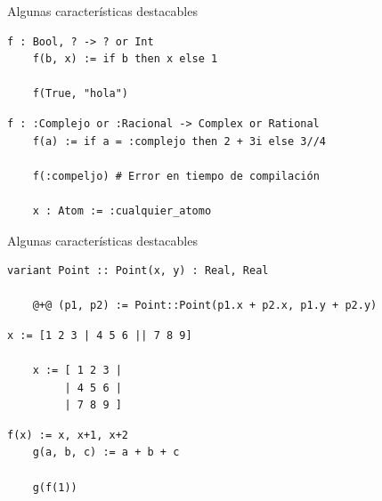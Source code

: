 \documentclass[compress]{beamer}
\begin{document}
\begin{frame}[fragile]{Algunas características destacables}
	\begin{lstlisting}[style=tail]
	f : Bool, ? -> ? or Int
	f(b, x) := if b then x else 1
	
	f(True, "hola")
	\end{lstlisting}
	
	\begin{lstlisting}[style=tail]
	f : :Complejo or :Racional -> Complex or Rational
	f(a) := if a = :complejo then 2 + 3i else 3//4
	
	f(:compeljo) # Error en tiempo de compilación
	
	x : Atom := :cualquier_atomo
	\end{lstlisting}

\end{frame}

\begin{frame}[fragile]{Algunas características destacables}
	\vspace{0.4cm}
	\begin{lstlisting}[style=tail]
	variant Point :: Point(x, y) : Real, Real
	               
	@+@ (p1, p2) := Point::Point(p1.x + p2.x, p1.y + p2.y)
	\end{lstlisting}
	\vspace{-0.4cm}
	\begin{lstlisting}[style=tail]
	x := [1 2 3 | 4 5 6 || 7 8 9]
	
	x := [ 1 2 3 |
	     | 4 5 6 |
	     | 7 8 9 ]
	\end{lstlisting}
	\vspace{-0.4cm}
	\begin{lstlisting}[style=tail]
	f(x) := x, x+1, x+2
	g(a, b, c) := a + b + c
	
	g(f(1))
	\end{lstlisting}	
\end{frame}
\end{document}
